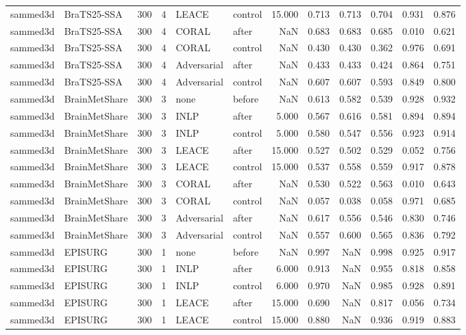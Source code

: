 \begin{tabular}{llrrllrrrrrr}
sammed3d & BraTS25-SSA & 300 & 4 & LEACE & control & 15.000 & 0.713 & 0.713 & 0.704 & 0.931 & 0.876 \\
sammed3d & BraTS25-SSA & 300 & 4 & CORAL & after & NaN & 0.683 & 0.683 & 0.685 & 0.010 & 0.621 \\
sammed3d & BraTS25-SSA & 300 & 4 & CORAL & control & NaN & 0.430 & 0.430 & 0.362 & 0.976 & 0.691 \\
sammed3d & BraTS25-SSA & 300 & 4 & Adversarial & after & NaN & 0.433 & 0.433 & 0.424 & 0.864 & 0.751 \\
sammed3d & BraTS25-SSA & 300 & 4 & Adversarial & control & NaN & 0.607 & 0.607 & 0.593 & 0.849 & 0.800 \\
sammed3d & BrainMetShare & 300 & 3 & none & before & NaN & 0.613 & 0.582 & 0.539 & 0.928 & 0.932 \\
sammed3d & BrainMetShare & 300 & 3 & INLP & after & 5.000 & 0.567 & 0.616 & 0.581 & 0.894 & 0.894 \\
sammed3d & BrainMetShare & 300 & 3 & INLP & control & 5.000 & 0.580 & 0.547 & 0.556 & 0.923 & 0.914 \\
sammed3d & BrainMetShare & 300 & 3 & LEACE & after & 15.000 & 0.527 & 0.502 & 0.529 & 0.052 & 0.756 \\
sammed3d & BrainMetShare & 300 & 3 & LEACE & control & 15.000 & 0.537 & 0.558 & 0.559 & 0.917 & 0.878 \\
sammed3d & BrainMetShare & 300 & 3 & CORAL & after & NaN & 0.530 & 0.522 & 0.563 & 0.010 & 0.643 \\
sammed3d & BrainMetShare & 300 & 3 & CORAL & control & NaN & 0.057 & 0.038 & 0.058 & 0.971 & 0.685 \\
sammed3d & BrainMetShare & 300 & 3 & Adversarial & after & NaN & 0.617 & 0.556 & 0.546 & 0.830 & 0.746 \\
sammed3d & BrainMetShare & 300 & 3 & Adversarial & control & NaN & 0.557 & 0.600 & 0.565 & 0.836 & 0.792 \\
sammed3d & EPISURG & 300 & 1 & none & before & NaN & 0.997 & NaN & 0.998 & 0.925 & 0.917 \\
sammed3d & EPISURG & 300 & 1 & INLP & after & 6.000 & 0.913 & NaN & 0.955 & 0.818 & 0.858 \\
sammed3d & EPISURG & 300 & 1 & INLP & control & 6.000 & 0.970 & NaN & 0.985 & 0.928 & 0.891 \\
sammed3d & EPISURG & 300 & 1 & LEACE & after & 15.000 & 0.690 & NaN & 0.817 & 0.056 & 0.734 \\
sammed3d & EPISURG & 300 & 1 & LEACE & control & 15.000 & 0.880 & NaN & 0.936 & 0.919 & 0.883 \\

\end{tabular}
